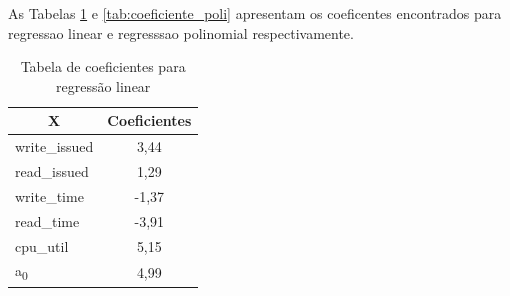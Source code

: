 \documentclass[[10pt,journal]{IEEEtran}
\begin{document}
As Tabelas \ref{tab:coeficiente_linear} e \ref{tab:coeficiente_poli} apresentam os coeficentes encontrados para regressao linear e regresssao polinomial respectivamente.
\begin{table}[!htb]
\centering
\caption{Tabela de coeficientes para regressão linear}
\label{tab:coeficiente_linear}
\begin{tabular}{|l|c|}
\hline
\multicolumn{1}{|c|}{X}   & \multicolumn{1}{l|}{Coeficientes} \\ \hline
write\_issued & 3,44                             \\ \hline
read\_issued  & 1,29                             \\ \hline
write\_time   & -1,37                            \\ \hline
read\_time    & -3,91                            \\ \hline
cpu\_util     & 5,15                             \\ \hline
a\textsubscript{0}           & 4,99                             \\ \hline
\end{tabular}
\end{table}
\end{document}
